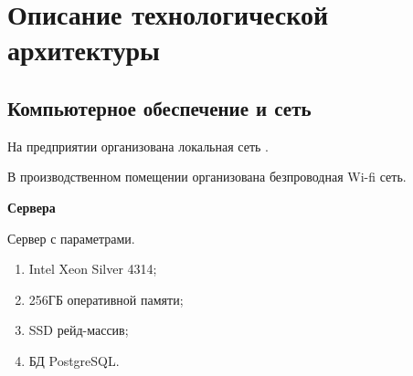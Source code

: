 \newpage

\chapter{Описание технологической архитектуры}

\section{Компьютерное обеспечение и сеть}

На предприятии организована локальная сеть . 

В производственном помещении организована безпроводная Wi-fi сеть.




\textbf{Сервера}



Сервер с параметрами. 
\begin{enumerate}
\item Intel Xeon Silver 4314; 
\item  256ГБ оперативной памяти;
\item SSD рейд-массив;
\item БД PostgreSQL.
\end{enumerate}





